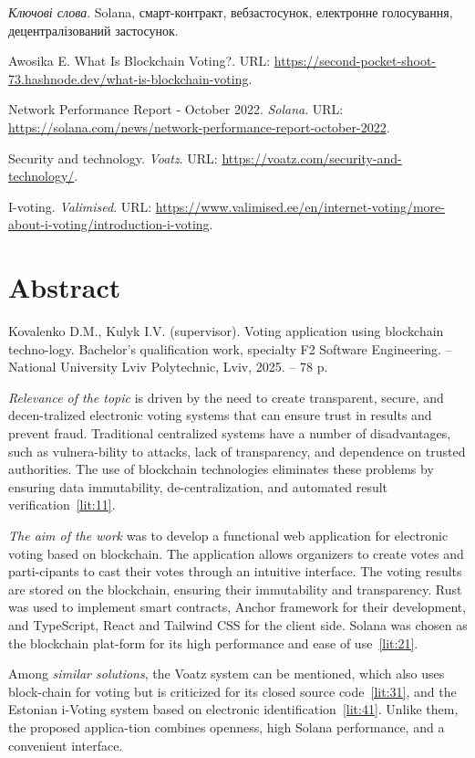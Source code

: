 \documentclass[14pt]{extreport}
\newcommand{\gq}[1]{\guillemotleft{}#1\guillemotright{}}
\newcommand{\plainchap}[1]{
  \chapter*{#1}
}
\begin{document}
  \textit{Ключові слова}. Solana, смарт-контракт, вебзастосунок, електронне голосування, децентралізований застосунок.

  \begin{enumerate}[label={[\arabic*]}]
    \item \label{lit:1} Awosika E. What Is Blockchain Voting?. URL: \url{https://second-pocket-shoot-73.hashnode.dev/what-is-blockchain-voting}.
    \item \label{lit:2} Network Performance Report - October 2022. \textit{Solana}. URL: \url{https://solana.com/news/network-performance-report-october-2022}.
    \item \label{lit:3} Security and technology. \textit{Voatz}. URL: \url{https://voatz.com/security-and-technology/}.
    \item \label{lit:4} I-voting. \textit{Valimised}. URL: \url{https://www.valimised.ee/en/internet-voting/more-about-i-voting/introduction-i-voting}.
  \end{enumerate}
  
  \plainchap{Abstract}
  
  Kovalenko D.M., Kulyk I.V. (supervisor). Voting application using blockchain techno-logy. Bachelor's qualification work, specialty F2 \gq{Software Engineering}. – National University \gq{Lviv Polytechnic}, Lviv, 2025. – 78 p.

  \textit{Relevance of the topic} is driven by the need to create transparent, secure, and decen-tralized electronic voting systems that can ensure trust in results and prevent fraud. Traditional centralized systems have a number of disadvantages, such as vulnera-bility to attacks, lack of transparency, and dependence on trusted authorities. The use of blockchain technologies eliminates these problems by ensuring data immutability, de-centralization, and automated result verification~\ref{lit:11}.

  \textit{The aim of the work} was to develop a functional web application for electronic voting based on blockchain. The application allows organizers to create votes and parti-cipants to cast their votes through an intuitive interface. The voting results are stored on the blockchain, ensuring their immutability and transparency. Rust was used to implement smart contracts, Anchor framework for their development, and TypeScript, React and Tailwind CSS for the client side. Solana was chosen as the blockchain plat-form for its high performance and ease of use~\ref{lit:21}.

  Among \textit{similar solutions}, the Voatz system can be mentioned, which also uses block-chain for voting but is criticized for its closed source code~\ref{lit:31}, and the Estonian i-Voting system based on electronic identification~\ref{lit:41}. Unlike them, the proposed applica-tion combines openness, high Solana performance, and a convenient interface.
\end{document}
